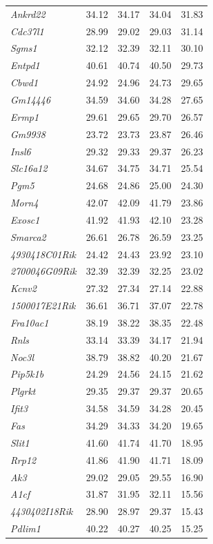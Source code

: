 \documentclass[oneside]{book}\usepackage[]{graphicx}\usepackage[]{color}
\begin{document}
\begin{appendices}
\begin{table}[ht]
\begin{tabular}{>{\em}lrrrr}
  Ankrd22 & 34.12 & 34.17 & 34.04 & 31.83 \\
  Cdc37l1 & 28.99 & 29.02 & 29.03 & 31.14 \\
  Sgms1 & 32.12 & 32.39 & 32.11 & 30.10 \\
  Entpd1 & 40.61 & 40.74 & 40.50 & 29.73 \\
  Cbwd1 & 24.92 & 24.96 & 24.73 & 29.65 \\
  Gm14446 & 34.59 & 34.60 & 34.28 & 27.65 \\
  Ermp1 & 29.61 & 29.65 & 29.70 & 26.57 \\
  Gm9938 & 23.72 & 23.73 & 23.87 & 26.46 \\
  Insl6 & 29.32 & 29.33 & 29.37 & 26.23 \\
  Slc16a12 & 34.67 & 34.75 & 34.71 & 25.54 \\
  Pgm5 & 24.68 & 24.86 & 25.00 & 24.30 \\
  Morn4 & 42.07 & 42.09 & 41.79 & 23.86 \\
  Exosc1 & 41.92 & 41.93 & 42.10 & 23.28 \\
  Smarca2 & 26.61 & 26.78 & 26.59 & 23.25 \\
  4930418C01Rik & 24.42 & 24.43 & 23.92 & 23.10 \\
  2700046G09Rik & 32.39 & 32.39 & 32.25 & 23.02 \\
  Kcnv2 & 27.32 & 27.34 & 27.14 & 22.88 \\
  1500017E21Rik & 36.61 & 36.71 & 37.07 & 22.78 \\
  Fra10ac1 & 38.19 & 38.22 & 38.35 & 22.48 \\
  Rnls & 33.14 & 33.39 & 34.17 & 21.94 \\
  Noc3l & 38.79 & 38.82 & 40.20 & 21.67 \\
  Pip5k1b & 24.29 & 24.56 & 24.15 & 21.62 \\
  Plgrkt & 29.35 & 29.37 & 29.37 & 20.65 \\
  Ifit3 & 34.58 & 34.59 & 34.28 & 20.45 \\
  Fas & 34.29 & 34.33 & 34.20 & 19.65 \\
  Slit1 & 41.60 & 41.74 & 41.70 & 18.95 \\
  Rrp12 & 41.86 & 41.90 & 41.71 & 18.09 \\
  Ak3 & 29.02 & 29.05 & 29.55 & 16.90 \\
  A1cf & 31.87 & 31.95 & 32.11 & 15.56 \\
  4430402I18Rik & 28.90 & 28.97 & 29.37 & 15.43 \\
  Pdlim1 & 40.22 & 40.27 & 40.25 & 15.25 \\

\end{tabular}
\end{table}
\end{appendices}
\end{document}
